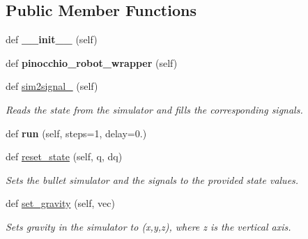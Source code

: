 \subsection*{Public Member Functions}
\begin{DoxyCompactItemize}
\item 
def {\bfseries \+\_\+\+\_\+init\+\_\+\+\_\+} (self)\hypertarget{classstuggihop__bullet_1_1StuggihopBulletRobot_a569b29d12262e456dce236bb166b9423}{}\label{classstuggihop__bullet_1_1StuggihopBulletRobot_a569b29d12262e456dce236bb166b9423}

\item 
def {\bfseries pinocchio\+\_\+robot\+\_\+wrapper} (self)\hypertarget{classstuggihop__bullet_1_1StuggihopBulletRobot_abf99ffa6f01c91a753f2c43870f8e923}{}\label{classstuggihop__bullet_1_1StuggihopBulletRobot_abf99ffa6f01c91a753f2c43870f8e923}

\item 
def \hyperlink{classstuggihop__bullet_1_1StuggihopBulletRobot_af75d6c773ccea849139a291173c0af09}{sim2signal\+\_\+} (self)
\begin{DoxyCompactList}\small\item\em Reads the state from the simulator and fills the corresponding signals. \end{DoxyCompactList}\item 
def {\bfseries run} (self, steps=1, delay=0.)\hypertarget{classstuggihop__bullet_1_1StuggihopBulletRobot_a20656822edcbffc313bd06dca182dcc4}{}\label{classstuggihop__bullet_1_1StuggihopBulletRobot_a20656822edcbffc313bd06dca182dcc4}

\item 
def \hyperlink{classstuggihop__bullet_1_1StuggihopBulletRobot_aea04a3ddb2665ed7aa19c81206c95bf7}{reset\+\_\+state} (self, q, dq)
\begin{DoxyCompactList}\small\item\em Sets the bullet simulator and the signals to the provided state values. \end{DoxyCompactList}\item 
def \hyperlink{classstuggihop__bullet_1_1StuggihopBulletRobot_ae497030ea6a7849f0a6bd6fb881f3935}{set\+\_\+gravity} (self, vec)
\begin{DoxyCompactList}\small\item\em Sets gravity in the simulator to (x,y,z), where z is the vertical axis. \end{DoxyCompactList}\end{DoxyCompactItemize}
